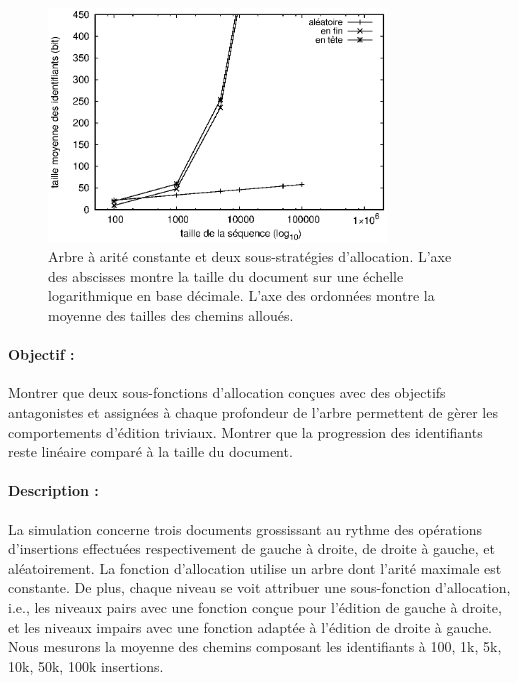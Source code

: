 \begin{figure}
  \begin{center}
    \includegraphics[width=0.8\textwidth]{img/lseq/robin.eps}
    \caption[Influence de deux sous-fonctions d'allocations sur la taille des
    chemins] {\label{repl:img:suballocation} Arbre à arité constante et deux
      sous-stratégies d'allocation. L'axe des abscisses montre la taille du
      document sur une échelle logarithmique en base décimale. L'axe des
      ordonnées montre la moyenne des tailles des chemins alloués.}
  \end{center}
\end{figure}

\paragraph{Objectif :} Montrer que deux sous-fonctions d'allocation conçues avec
des objectifs antagonistes et assignées à chaque profondeur de l'arbre
permettent de gèrer les comportements d'édition triviaux. Montrer que la
progression des identifiants reste linéaire comparé à la taille du document.

\paragraph{Description :} La simulation concerne trois documents grossissant au
rythme des opérations d'insertions effectuées respectivement de gauche à droite,
de droite à gauche, et aléatoirement. La fonction d'allocation utilise un arbre
dont l'arité maximale est constante. De plus, chaque niveau se voit attribuer
une sous-fonction d'allocation, i.e., les niveaux pairs avec une fonction conçue
pour l'édition de gauche à droite, et les niveaux impairs avec une fonction
adaptée à l'édition de droite à gauche. Nous mesurons la moyenne des chemins
composant les identifiants à 100, 1k, 5k, 10k, 50k, 100k insertions.


